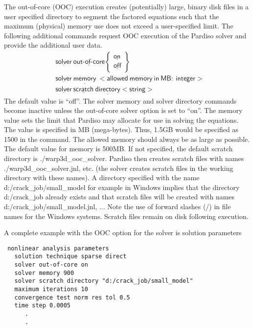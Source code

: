 \documentclass[11pt]{report}
\numberwithin{equation}{section}
\newcommand{\nin} {\noindent}
\newcommand{\ul} {\underline}
\newcommand{\hv} {\mathsf}   %
\begin{document}
The out-of-core (OOC) execution creates (potentially) large, binary disk files in a user specified 
directory to segment the factored equations such that the maximum (physical) 
memory use does not exceed a user-specified limit. The following additional commands
request OOC execution of the Pardiso solver and provide the additional user data.
\begin{align*}
& \hv{\ul{solver}\ \ul{out\mbox{-}of\mbox{-}core} }
\begin{Bmatrix}
\hv{\ul{on}} \\ \hv{\ul{off}}
\end{Bmatrix}
\\
&\hv{ \ul{solver}\ \ul{memory}\ <allowed\ memory\ in\ MB:\ integer>} \\
&\hv{ \ul{solver}\ \ul{scratch}\ \ul{directory} <string>} 
\end{align*}
\nin The default value is ``off''. The solver memory and solver directory commands become
inactive unless the out-of-core solver option is set to ``on''. The memory value sets the limit that
Pardiso may allocate for use in solving the equations. The value is specified in 
MB (mega-bytes). Thus, 1.5GB would be specified as 1500 in the command. 
The allowed memory should always be as large as possible. The default value for 
memory is 500MB. If not specified, the default scratch directory is
 ./warp3d\_ooc\_solver. Pardiso then creates scratch files with names 
./warp3d\_ooc\_solver.jnl, etc. (the solver creates scratch files in the working 
directory with these names). A directory specified with the name 
d:/crack\_job/small\_model for example in Windows implies that the 
directory d:/crack\_job already exists and that scratch files will be created 
with names d:/crack\_job/small\_model.jnl, ... Note the use of 
forward slashes (/) in file names for the Windows systems. 
Scratch files remain on disk following execution.

A complete example with the OOC option for the solver is
solution parameters
\small
\begin{verbatim}
 nonlinear analysis parameters
   solution technique sparse direct
   solver out-of-core on
   solver memory 900
   solver scratch directory "d:/crack_job/small_model"
   maximum iterations 10
   convergence test norm res tol 0.5
   time step 0.0005
      .
      .
\end{verbatim}
\normalsize
\end{document}
